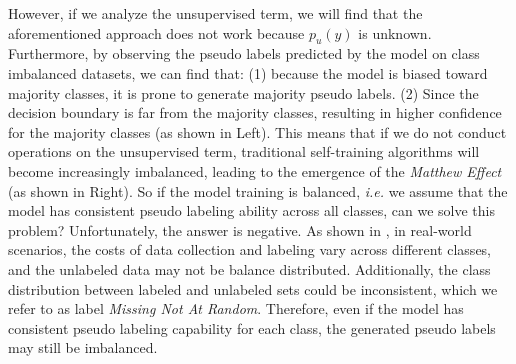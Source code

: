 However, if we analyze the unsupervised term, we will find that the aforementioned approach does not work because $p_u(y)$ is unknown. Furthermore, by observing the pseudo labels predicted by the model on class imbalanced datasets, we can find that: (1) because the model is biased toward majority classes, it is prone to generate majority pseudo labels. (2) Since the decision boundary is far from the majority classes, resulting in higher confidence for the majority classes (as shown in  Left). This means that if we do not conduct operations on the unsupervised term, traditional self-training algorithms will become increasingly imbalanced, leading to the emergence of the \emph{Matthew Effect} (as shown in  Right). So if the model training is balanced, \emph{i.e.} we assume that the model has consistent pseudo labeling ability across all classes, can we solve this problem? Unfortunately, the answer is negative. As shown in , in real-world scenarios, the costs of data collection and labeling vary across different classes, and the unlabeled data may not be balance distributed. Additionally, the class distribution between labeled and unlabeled sets could be inconsistent, which we refer to as label \emph{Missing Not At Random}. Therefore, even if the model has consistent pseudo labeling capability for each class, the generated pseudo labels may still be imbalanced.

